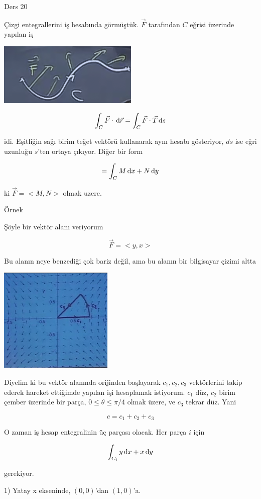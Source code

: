 \documentclass[12pt,fleqn]{article}\usepackage{../../common}
\begin{document}
Ders 20

Çizgi entegrallerini iş hesabında görmüştük. $\vec{F}$ tarafından $C$
eğrisi üzerinde yapılan iş

\includegraphics[height=3cm]{20_1.png}

$$ \int_C \vec{F} \cdot \,\mathrm{d}\vec{r} =  \int_C \vec{F} \cdot \vec{T} \,\mathrm{d} s $$

idi. Eşitliğin sağı birim teğet vektörü kullanarak aynı hesabı gösteriyor, $ds$
ise eğri uzunluğu $s$'ten ortaya çıkıyor. Diğer bir form

$$ = \int_C M \,\mathrm{d} x + N \,\mathrm{d} y $$

ki $\vec{F} = < M,N >$ olmak uzere. 

Örnek 

Şöyle bir vektör alanı veriyorum

$$ \vec{F} = < y,x > $$

Bu alanın neye benzediği çok bariz değil, ama bu alanın bir bilgisayar
çizimi altta

\includegraphics[height=5cm]{20_2.png}

Diyelim ki bu vektör alanında orijinden başlayarak $c_1,c_2,c_3$ vektörlerini
takip ederek hareket ettiğimde yapılan işi hesaplamak istiyorum. $c_1$ düz,
$c_2$ birim çember üzerinde bir parça, $0 \le \theta \le \pi / 4$ olmak üzere,
ve $c_3$ tekrar düz. Yani

$$ c = c_1 + c_2 + c_3 $$

O zaman iş hesap entegralinin üç parçası olacak. Her parça $i$ için 

$$ \int_{C_i} y \,\mathrm{d} x + x \,\mathrm{d} y $$

gerekiyor. 

1) Yatay x ekseninde, $(0,0)$'dan $(1,0)$'a. 
\end{document}
